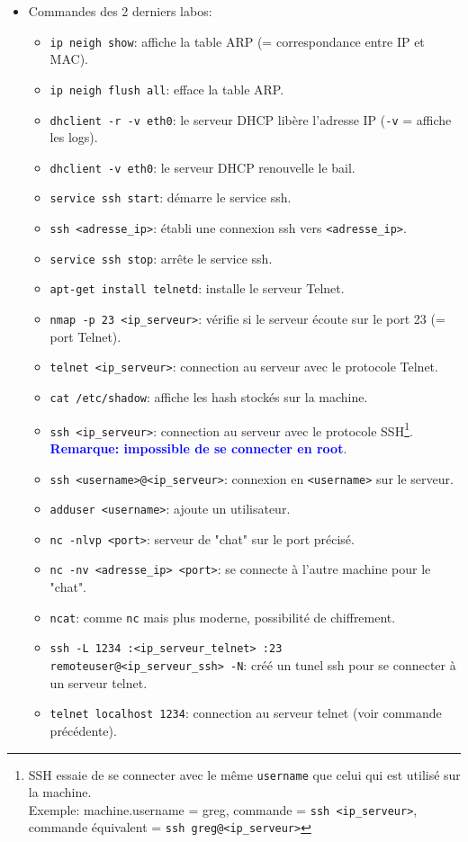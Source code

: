 \documentclass[a4paper]{article}
\renewcommand{\tt}{\texttt}
\begin{document}
\begin{itemize}
\item Commandes des 2 derniers labos:
\begin{itemize}
    \item \tt{ip neigh show}: affiche la table ARP (= correspondance entre IP et MAC).
    \item \tt{ip neigh flush all}: efface la table ARP.
    \item \tt{dhclient -r -v eth0}: le serveur DHCP libère l'adresse IP (\tt{-v} = affiche les logs).
    \item \tt{dhclient -v eth0}: le serveur DHCP renouvelle le bail.
    \item \tt{service ssh start}: démarre le service ssh.
    \item \tt{ssh <adresse\_ip>}: établi une connexion ssh vers \tt{<adresse\_ip>}.
    \item \tt{service ssh stop}: arrête le service ssh.
    \item \tt{apt-get install telnetd}: installe le serveur Telnet.
    \item \tt{nmap -p 23 <ip\_serveur>}: vérifie si le serveur écoute sur le port 23 (= port Telnet).
    \item \tt{telnet <ip\_serveur>}: connection au serveur avec le protocole Telnet.
    \item \tt{cat /etc/shadow}: affiche les hash stockés sur la machine.
    \item \tt{ssh <ip\_serveur>}: connection au serveur avec le protocole SSH\footnote{SSH essaie de se connecter avec le même \tt{username} que celui qui est utilisé sur la machine. \\Exemple: machine.username = greg, commande = \tt{ssh <ip\_serveur>}, commande équivalent = \tt{ssh greg@<ip\_serveur>}}. \\
    \textcolor{blue}{\textbf{Remarque: impossible de se connecter en root}}.
    \item \tt{ssh <username>@<ip\_serveur>}: connexion en \tt{<username>} sur le serveur.
    \item \tt{adduser <username>}: ajoute un utilisateur.
    \item \tt{nc -nlvp <port>}: serveur de "chat" sur le port précisé.
    \item \tt{nc -nv <adresse\_ip> <port>}: se connecte à l'autre machine pour le "chat".
    \item \tt{ncat}: comme \tt{nc} mais plus moderne, possibilité de chiffrement.
    \item \tt{ssh -L 1234 :<ip\_serveur\_telnet> :23 remoteuser@<ip\_serveur\_ssh> -N}: créé un tunel ssh pour se connecter à un serveur telnet.
    \item \tt{telnet localhost 1234}: connection au serveur telnet (voir commande précédente).
\end{itemize}

\end{itemize}
\end{document}
